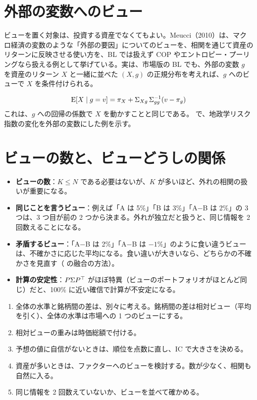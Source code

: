 \section{外部の変数へのビュー}

ビューを置く対象は、投資する資産でなくてもよい。Meucci（2010）は、マクロ経済の変数のような「外部の要因」についてのビューを、相関を通じて資産のリターンに反映させる使い方を、BL では扱えず COP やエントロピー・プーリングなら扱える例として挙げている。実は、市場版の BL でも、外部の変数 $g$ を資産のリターン $X$ と一緒に並べた $(X,g)$ の正規分布を考えれば、$g$ へのビューで $X$ を条件付けられる。

\begin{equation}
\mathrm{E}[X\mid g=v]=\pi_X+\Sigma_{Xg}\,\Sigma_{gg}^{-1}(v-\pi_g)
\end{equation}
これは、$g$ への回帰の係数で $X$ を動かすことと同じである。 で、地政学リスク指数の変化を外部の変数にした例を示す。

\section{ビューの数と、ビューどうしの関係}

\begin{itemize}
\item \textbf{ビューの数}：$K\le N$ である必要はないが、$K$ が多いほど、外れの相関の扱いが重要になる。
\item \textbf{同じことを言うビュー}：例えば「A は 5\%」「B は 3\%」「A$-$B は 2\%」の 3 つは、3 つ目が前の 2 つから決まる。外れが独立だと扱うと、同じ情報を 2 回数えることになる。
\item \textbf{矛盾するビュー}：「A$-$B は 2\%」「A$-$B は $-1\%$」のように食い違うビューは、不確かさに応じた平均になる。食い違いが大きいなら、どちらかの不確かさを見直す（ の融合の方法）。
\item \textbf{計算の安定性}：$P\Sigma P^{\top}$ がほぼ特異（ビューのポートフォリオがほとんど同じ）だと、100\% に近い確信で計算が不安定になる。
\end{itemize}

\begin{tipbox}[コツ：ビューの形]
\begin{enumerate}
\item 全体の水準と銘柄間の差は、別々に考える。銘柄間の差は相対ビュー（平均を引く）、全体の水準は市場への 1 つのビューにする。
\item 相対ビューの重みは時価総額で付ける。
\item 予想の値に自信がないときは、順位を点数に直し、IC で大きさを決める。
\item 資産が多いときは、ファクターへのビューを検討する。数が少なく、相関も自然に入る。
\item 同じ情報を 2 回数えていないか、ビューを並べて確かめる。
\end{enumerate}
\end{tipbox}


